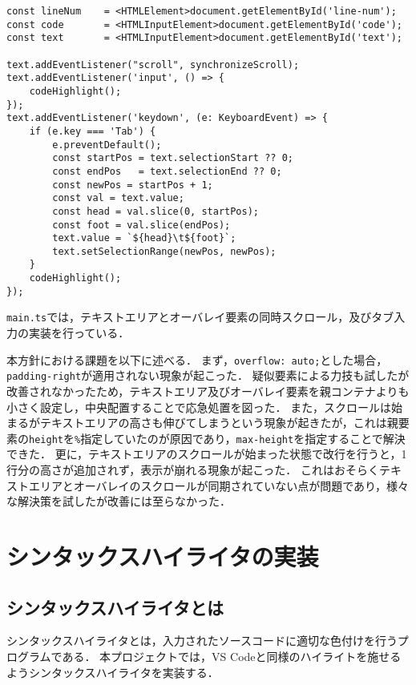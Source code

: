 \documentclass[autodetect-engine,dvi=dvipdfmx,ja=standard,
               a4j,11pt]{bxjsarticle}
\begin{document}
\begin{lstlisting}[caption={{\tt main.ts(コンテンツ制御部抜粋)}(オーバレイ)}, label={prog:overlay-ts}]
const lineNum    = <HTMLElement>document.getElementById('line-num');
const code       = <HTMLInputElement>document.getElementById('code');
const text       = <HTMLInputElement>document.getElementById('text');

text.addEventListener("scroll", synchronizeScroll);
text.addEventListener('input', () => {
    codeHighlight();
});
text.addEventListener('keydown', (e: KeyboardEvent) => {
    if (e.key === 'Tab') {
        e.preventDefault();
        const startPos = text.selectionStart ?? 0;
        const endPos   = text.selectionEnd ?? 0;
        const newPos = startPos + 1;
        const val = text.value;
        const head = val.slice(0, startPos);
        const foot = val.slice(endPos);
        text.value = `${head}\t${foot}`;
        text.setSelectionRange(newPos, newPos);
    }
    codeHighlight();
});
\end{lstlisting}

\verb|main.ts|では，テキストエリアとオーバレイ要素の同時スクロール，及びタブ入力の実装を行っている．

本方針における課題を以下に述べる．
まず，\verb|overflow: auto;|とした場合，\verb|padding-right|が適用されない現象が起こった．
疑似要素による力技も試したが改善されなかったため，テキストエリア及びオーバレイ要素を親コンテナよりも小さく設定し，中央配置することで応急処置を図った．
また，スクロールは始まるがテキストエリアの高さも伸びてしまうという現象が起きたが，これは親要素の\verb|height|を\verb|%|指定していたのが原因であり，\verb|max-height|を指定することで解決できた．
更に，テキストエリアのスクロールが始まった状態で改行を行うと，1行分の高さが追加されず，表示が崩れる現象が起こった．
これはおそらくテキストエリアとオーバレイのスクロールが同期されていない点が問題であり，様々な解決策を試したが改善には至らなかった．

\section{シンタックスハイライタの実装}

\subsection{シンタックスハイライタとは}

シンタックスハイライタとは，入力されたソースコードに適切な色付けを行うプログラムである．
本プロジェクトでは，VS Codeと同様のハイライトを施せるようシンタックスハイライタを実装する．
\end{document}
